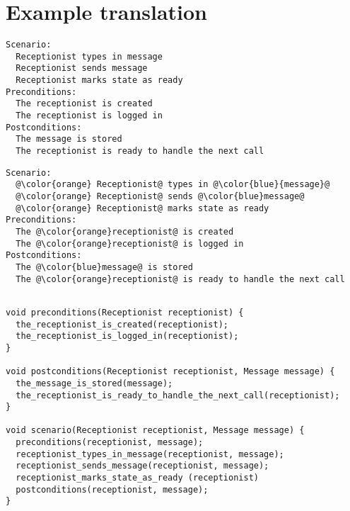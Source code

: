 \section{Example translation}


\begin{lstlisting}[frame=single,style=usecase, caption=Use case example revisited, label=lst:uc-simple-example-revisited]
Scenario:
  Receptionist types in message
  Receptionist sends message
  Receptionist marks state as ready 
Preconditions:
  The receptionist is created
  The receptionist is logged in
Postconditions:
  The message is stored
  The receptionist is ready to handle the next call
\end{lstlisting}

\begin{lstlisting}[frame=single,style=usecase, caption=Use case example with its different parts highlighted, label=lst:uc-simple-example-highlighted-revisited]
Scenario:
  @\color{orange} Receptionist@ types in @\color{blue}{message}@
  @\color{orange} Receptionist@ sends @\color{blue}message@
  @\color{orange} Receptionist@ marks state as ready
Preconditions:
  The @\color{orange}receptionist@ is created
  The @\color{orange}receptionist@ is logged in
Postconditions:
  The @\color{blue}message@ is stored
  The @\color{orange}receptionist@ is ready to handle the next call
\end{lstlisting} 

\begin{lstlisting}[style=Dart, caption=Example of generated code without a template applied concept,label={lst:generated-test-code-example}]

void preconditions(Receptionist receptionist) {
  the_receptionist_is_created(receptionist);
  the_receptionist_is_logged_in(receptionist);
}

void postconditions(Receptionist receptionist, Message message) {
  the_message_is_stored(message);
  the_receptionist_is_ready_to_handle_the_next_call(receptionist);
}

void scenario(Receptionist receptionist, Message message) {
  preconditions(receptionist, message);
  receptionist_types_in_message(receptionist, message);
  receptionist_sends_message(receptionist, message);
  receptionist_marks_state_as_ready (receptionist)  
  postconditions(receptionist, message);
}

\end{lstlisting}



